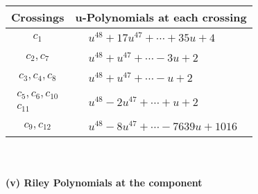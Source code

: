\documentclass[1p]{elsarticle_modified}
\theoremstyle{definition}
\begin{document}
\begin{tabular}{m{50pt}|m{274pt}}
Crossings & \hspace{64pt}u-Polynomials at each crossing \\
\hline $$\begin{aligned}c_{1}\end{aligned}$$&$\begin{aligned}
&u^{48}+17 u^{47}+\cdots+35 u+4
\end{aligned}$\\
\hline $$\begin{aligned}c_{2},c_{7}\end{aligned}$$&$\begin{aligned}
&u^{48}+u^{47}+\cdots-3 u+2
\end{aligned}$\\
\hline $$\begin{aligned}c_{3},c_{4},c_{8}\end{aligned}$$&$\begin{aligned}
&u^{48}+u^{47}+\cdots- u+2
\end{aligned}$\\
\hline $$\begin{aligned}c_{5},c_{6},c_{10}\\c_{11}\end{aligned}$$&$\begin{aligned}
&u^{48}-2 u^{47}+\cdots+u+2
\end{aligned}$\\
\hline $$\begin{aligned}c_{9},c_{12}\end{aligned}$$&$\begin{aligned}
&u^{48}-8 u^{47}+\cdots-7639 u+1016
\end{aligned}$\\
\hline
\end{tabular}\\~\\
\newpage\renewcommand{\arraystretch}{1}
\flushleft \textbf{(v) Riley Polynomials at the component}\newline \\
\end{document}
